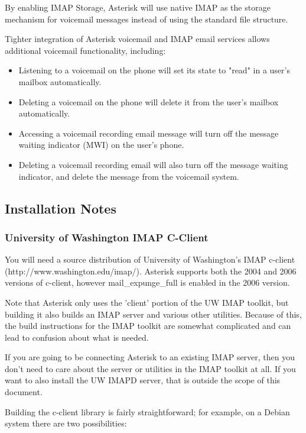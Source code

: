 By enabling IMAP Storage,  Asterisk will use native IMAP as the storage
mechanism for voicemail messages instead of using the standard file structure.

Tighter integration of Asterisk voicemail and IMAP email services allows
additional voicemail functionality, including:

\begin{itemize}
 \item Listening to a voicemail on the phone will set its state to "read" in
   a user's mailbox automatically.
 \item Deleting a voicemail on the phone will delete it from the user's
   mailbox automatically.
 \item Accessing a voicemail recording email message will turn off the message
   waiting indicator (MWI) on the user's phone.
 \item Deleting a voicemail recording email will also turn off the message 
   waiting indicator, and delete the message from the voicemail system.
\end{itemize}

\subsection{Installation Notes}

\subsubsection{University of Washington IMAP C-Client}

You will need a source distribution of University of Washington's IMAP
c-client (http://www.washington.edu/imap/).  Asterisk supports both the
2004 and 2006 versions of c-client, however mail\_expunge\_full is enabled
in the 2006 version.

Note that Asterisk only uses the 'client' portion of the UW IMAP toolkit,
but building it also builds an IMAP server and various other utilities.
Because of this, the build instructions for the IMAP toolkit are somewhat
complicated and can lead to confusion about what is needed.

If you are going to be connecting Asterisk to an existing IMAP server,
then you don't need to care about the server or utilities in the IMAP
toolkit at all. If you want to also install the UW IMAPD server, that
is outside the scope of this document.

Building the c-client library is fairly straightforward; for example, on a
Debian system there are two possibilities:

